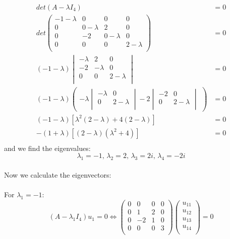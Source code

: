 \documentclass{article}
\begin{document}
\begin{align*}
    det(A-\lambda I_4) &= 0 \\
    det
    \begin{pmatrix}
    -1-\lambda & 0 & 0 & 0 \\
    0 & 0-\lambda & 2 & 0 \\
    0 & -2 & 0-\lambda & 0 \\
    0 & 0 & 0 & 2-\lambda \\
\end{pmatrix} 
&= 0 \\
(-1-\lambda)
\begin{vmatrix}
    -\lambda & 2 & 0 \\
    -2 & -\lambda & 0 \\
    0 & 0 & 2-\lambda \\ 
\end{vmatrix}
&= 0 \\
(-1-\lambda)
\begin{pmatrix}
    -\lambda
    \begin{vmatrix}
        -\lambda & 0 \\
        0 & 2-\lambda \\
    \end{vmatrix}
    -2
    \begin{vmatrix}
        -2 & 0 \\
        0 & 2-\lambda \\
    \end{vmatrix}
\end{pmatrix}
&= 0 \\
(-1-\lambda)[\lambda^2(2-\lambda)+4(2-\lambda)] &= 0 \\
-(1+\lambda)[(2-\lambda)(\lambda^2+4)] &=0 \\
\end{align*}
and we find the eigenvalues: \\
$$\lambda_{1} = -1, \, \lambda_{2} = 2, \, \lambda_{3} = 2i, \, \lambda_{4} = -2i $$ \\
Now we calculate the eigenvectors: \\ \\
For $\lambda_{1} = -1$: \\
$$(A-\lambda_{1}I_{4})u_{1} = 0 \iff 
\begin{pmatrix}
     0 & 0 & 0 & 0 \\
     0 & 1 & 2 & 0 \\
     0 & -2 & 1 & 0 \\
     0 & 0 & 0 & 3 \\
\end{pmatrix}
\begin{pmatrix}
     u_{11} \\
     u_{12} \\
     u_{13} \\
     u_{14} \\
\end{pmatrix}
= 0 $$
\end{document}
